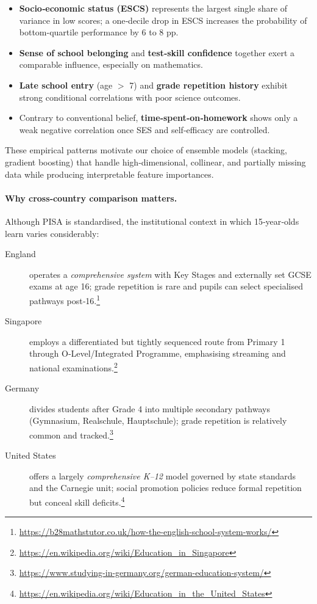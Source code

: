\begin{itemize}
    \item \textbf{Socio‑economic status (ESCS)} represents the largest single share of variance in low scores; a one‑decile drop in ESCS increases the probability of bottom-quartile performance by 6 to 8 pp.
    \item \textbf{Sense of school belonging} and \textbf{test‑skill confidence} together exert a comparable influence, especially on mathematics.
    \item \textbf{Late school entry} (age $>$ 7) and \textbf{grade repetition history} exhibit strong conditional correlations with poor science outcomes.
    \item Contrary to conventional belief, \textbf{time‑spent‑on‑homework} shows only a weak negative correlation once SES and self‑efficacy are controlled.
\end{itemize}

These empirical patterns motivate our choice of ensemble models (stacking, gradient boosting) that handle high‑dimensional, collinear, and partially missing data while producing interpretable feature importances.

\paragraph{Why cross‑country comparison matters.}
Although PISA is standardised, the institutional context in which 15‑year‑olds learn varies considerably:

\begin{description}
    \item[England] operates a \emph{comprehensive system} with Key Stages and externally set GCSE exams at age 16; grade repetition is rare and pupils can select specialised pathways post‑16.\footnote{\url{https://b28mathstutor.co.uk/how-the-english-school-system-works/}}
    \item[Singapore] employs a differentiated but tightly sequenced route from Primary 1 through O‑Level/Integrated Programme, emphasising streaming and national examinations.\footnote{\url{https://en.wikipedia.org/wiki/Education_in_Singapore}}
    \item[Germany] divides students after Grade 4 into multiple secondary pathways (Gymnasium, Realschule, Hauptschule); grade repetition is relatively common and tracked.\footnote{\url{https://www.studying-in-germany.org/german-education-system/}}
    \item[United States] offers a largely \emph{comprehensive K–12} model governed by state standards and the Carnegie unit; social promotion policies reduce formal repetition but conceal skill deficits.\footnote{\url{https://en.wikipedia.org/wiki/Education_in_the_United_States}}
\end{description}


